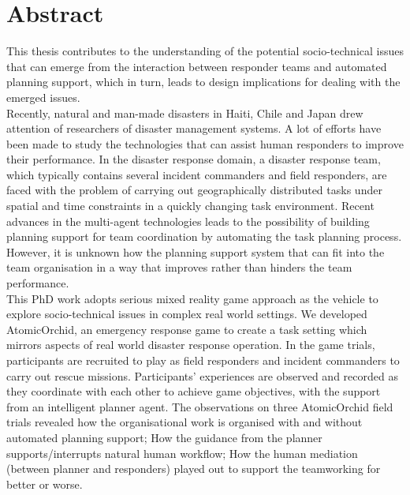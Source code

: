 \begingroup
\let\clearpage\relax
\let\cleardoublepage\relax
\let\cleardoublepage\relax

\chapter*{Abstract}
This thesis contributes to the understanding of the potential socio-technical issues that can emerge from the interaction between responder teams and automated planning support, which in turn, leads to design implications for dealing with the emerged issues. \\

Recently, natural and man-made disasters in Haiti, Chile and Japan drew attention of researchers of disaster management systems. A lot of efforts have been made to study the technologies that can assist human responders to improve their performance. In the disaster response domain,  a disaster response team, which typically contains several incident commanders and field responders, are faced with the problem of carrying out geographically distributed tasks under spatial and time constraints in a quickly changing task environment. Recent advances in the multi-agent technologies leads to the possibility of building planning support for team coordination by automating the task planning process. However, it is unknown how the planning support system that can fit into the team organisation in a way that improves rather than hinders the team performance.\\

This PhD work adopts serious mixed reality game approach as the vehicle to explore socio-technical issues in complex real world settings. We developed AtomicOrchid, an emergency response game to create a task setting which mirrors aspects of real world disaster response operation. In the game trials, participants are recruited to play as field responders and incident commanders to carry out rescue missions. Participants' experiences are observed and recorded as they coordinate with each other to achieve game objectives, with the support from an intelligent planner agent. The observations on three AtomicOrchid field trials revealed how the organisational work is organised with and without automated planning support; How the guidance from the planner supports/interrupts natural human workflow; How the human mediation (between planner and responders) played out to support the teamworking for better or worse. \\

